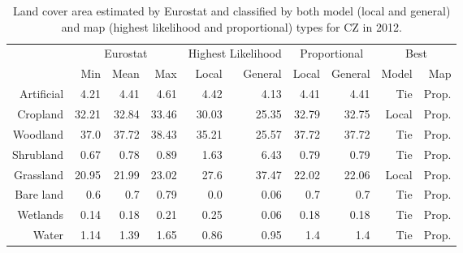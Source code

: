     \begin{table}[H]
    \centering
    \caption{Land cover area estimated by Eurostat and classified by both model (local and general) and map (highest likelihood and proportional) types for CZ in 2012.}
    
    \begin{tabular}{r|rrr|rr|rr|rr}
    \toprule
    {} & \multicolumn{3}{|c}{Eurostat} & \multicolumn{2}{|c}{Highest Likelihood} & \multicolumn{2}{|c}{Proportional} & \multicolumn{2}{|c}{Best} \\
    {} &      Min &   Mean &    Max &              Local & General &        Local & General &  Model &    Map \\
    \midrule
    Artificial &     4.21 &   4.41 &   4.61 &               4.42 &    4.13 &         4.41 &    4.41 &    Tie &  Prop. \\
    Cropland   &    32.21 &  32.84 &  33.46 &              30.03 &   25.35 &        32.79 &   32.75 &  Local &  Prop. \\
    Woodland   &     37.0 &  37.72 &  38.43 &              35.21 &   25.57 &        37.72 &   37.72 &    Tie &  Prop. \\
    Shrubland  &     0.67 &   0.78 &   0.89 &               1.63 &    6.43 &         0.79 &    0.79 &    Tie &  Prop. \\
    Grassland  &    20.95 &  21.99 &  23.02 &               27.6 &   37.47 &        22.02 &   22.06 &  Local &  Prop. \\
    Bare land  &      0.6 &    0.7 &   0.79 &                0.0 &    0.06 &          0.7 &     0.7 &    Tie &  Prop. \\
    Wetlands   &     0.14 &   0.18 &   0.21 &               0.25 &    0.06 &         0.18 &    0.18 &    Tie &  Prop. \\
    Water      &     1.14 &   1.39 &   1.65 &               0.86 &    0.95 &          1.4 &     1.4 &    Tie &  Prop. \\
    \bottomrule
    \end{tabular}
    \end{table}
    
